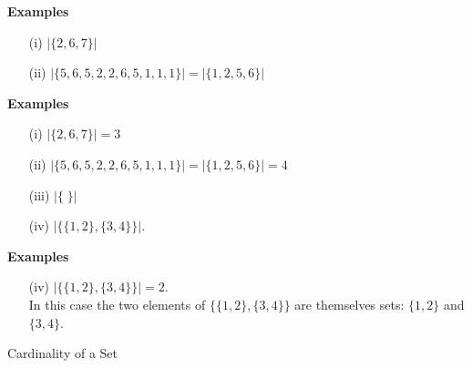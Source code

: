 

\textbf{Examples}
\begin{itemize}
\item[(i)] $|\{2,6,7\}| $

\item[(ii)] $|\{5,6,5,2,2,6,5,1,1,1\}| = |\{1,2,5,6\}| $
\end{itemize}





\textbf{Examples}
\begin{itemize}
\item[(i)] $|\{2,6,7\}| = 3$

\item[(ii)] $|\{5,6,5,2,2,6,5,1,1,1\}| = |\{1,2,5,6\}| = 4$

\item[(iii)] $|\{ \; \}| $

\item[(iv)] $|\{\{1,2\},\{3,4\}\}| $.
\end{itemize}





\textbf{Examples}
\begin{itemize}

\item[(iv)] $|\{\{1,2\},\{3,4\}\}| = 2$. \\ \vspace{0.4cm} In this case the two elements of $\{\{1,2\},\{3,4\}\}$ are themselves sets: $\{1,2\}$ and $\{3,4\}$.
\end{itemize}

\newpage



{Cardinality of a Set}

